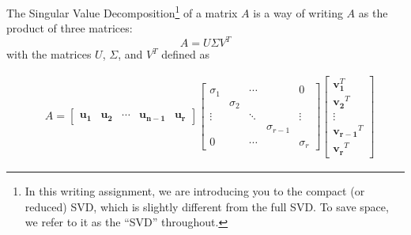 \documentclass[10pt,addpoints]{exam} %
\begin{document}
\begin{questions}
  The Singular Value Decomposition\footnote{In this writing assignment, we are introducing you to
    the compact (or reduced) SVD, which is slightly different from the full SVD. To save space, we
    refer to it as the ``SVD'' throughout.} of a matrix $A$ is a way of writing $A$ as the product of three
  matrices:
\begin{equation}
  \label{eq:1}
  A=U \Sigma V^T
\end{equation}
with the
matrices $U$, $\Sigma$, and $V^T$ defined as 

\begin{equation}
  \begin{aligned}
    & A=\left[\begin{array}{lllll}
                \mathbf{u}_{\mathbf{1}} & \mathbf{u}_{\mathbf{2}} & \cdots & \mathbf{u}_{\mathbf{n}-\mathbf{1}} & \mathbf{u}_{\mathbf{r}}
              \end{array}\right]\left[\begin{array}{lllll}
                                        \sigma_1 & & \cdots& & 0\\
                                                 & \sigma_2 & & & \\
                                                 \vdots& & \ddots & & \vdots\\
                                                 & & & \sigma_{r-1} & \\
                                                 0& & \cdots& & \sigma_r
                                      \end{array}\right]\left[\begin{array}{c}
                                                                \mathbf{v}_{\mathbf{1}}^T \\
                                                                \mathbf{v}_{\mathbf{2}}{ }^T \\
                                                                \vdots \\
                                                                \mathbf{v}_{\mathbf{r-1}}{ }^T \\
                                                                \mathbf{v}_{\mathbf{r}}{ }^T
                                                              \end{array}\right]
  \end{aligned}
  \label{eq:sdv_1}
\end{equation}


\end{questions}
\end{document}
